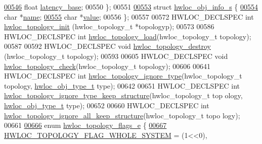 \begin{DoxyCode}
\hypertarget{a00033_source_l00546}{}\hyperlink{a00014_a204416418049a272bfb51602fc676342}{00546}   \textcolor{keywordtype}{float} \hyperlink{a00014_a204416418049a272bfb51602fc676342}{latency_base};           
00550 \};
00551 
\hypertarget{a00033_source_l00553}{}\hyperlink{a00018}{00553} \textcolor{keyword}{struct }\hyperlink{a00018}{hwloc_obj_info_s} \{
\hypertarget{a00033_source_l00554}{}\hyperlink{a00018_a115dde58f40338a2d3276d59c099857d}{00554}   \textcolor{keywordtype}{char} *\hyperlink{a00018_a115dde58f40338a2d3276d59c099857d}{name};   
\hypertarget{a00033_source_l00555}{}\hyperlink{a00018_a522efd7f5262a4493a73fa3476a041ce}{00555}   \textcolor{keywordtype}{char} *\hyperlink{a00018_a522efd7f5262a4493a73fa3476a041ce}{value};  
00556 \};
00557 
00572 HWLOC\_DECLSPEC \textcolor{keywordtype}{int} \hyperlink{a00043_ga5c2d6f476af87005c7bd0811d4548b9f}{hwloc_topology_init} (hwloc\_topology\_t *topologyp);
00573 
00586 HWLOC\_DECLSPEC \textcolor{keywordtype}{int} \hyperlink{a00043_ga91e2e6427b95fb7339c99dbbef996e71}{hwloc_topology_load}(hwloc\_topology\_t topology);
00587 
00592 HWLOC\_DECLSPEC \textcolor{keywordtype}{void} \hyperlink{a00043_ga6040925d3ee4bbb2647f2a321aca5f4b}{hwloc_topology_destroy} (hwloc\_topology\_t topology);
00593 
00605 HWLOC\_DECLSPEC \textcolor{keywordtype}{void} \hyperlink{a00043_gab3628b2a540a5a08e8cf724ef829e70a}{hwloc_topology_check}(hwloc\_topology\_t topology);
00606 
00641 HWLOC\_DECLSPEC \textcolor{keywordtype}{int} \hyperlink{a00044_gaf2071c8621fddc53649c245d87835b47}{hwloc_topology_ignore_type}(hwloc\_topology\_t topology, 
      \hyperlink{a00041_gacd37bb612667dc437d66bfb175a8dc55}{hwloc_obj_type_t} type);
00642 
00651 HWLOC\_DECLSPEC \textcolor{keywordtype}{int} \hyperlink{a00044_ga6ddd4213d95bd1c30555b294a60efa6b}{hwloc_topology_ignore_type_keep_structure}(hwloc\_topology\_t top
      ology, \hyperlink{a00041_gacd37bb612667dc437d66bfb175a8dc55}{hwloc_obj_type_t} type);
00652 
00660 HWLOC\_DECLSPEC \textcolor{keywordtype}{int} \hyperlink{a00044_gaec6fb00050f50cd41007f1ae580d2106}{hwloc_topology_ignore_all_keep_structure}(hwloc\_topology\_t topo
      logy);
00661 
\hypertarget{a00033_source_l00666}{}\hyperlink{a00044_gada025d3ec20b4b420f8038d23d6e7bde}{00666} \textcolor{keyword}{enum} \hyperlink{a00044_gada025d3ec20b4b420f8038d23d6e7bde}{hwloc_topology_flags_e} \{
\hypertarget{a00033_source_l00667}{}\hyperlink{a00044_ggada025d3ec20b4b420f8038d23d6e7bdea129b4fea1300be22bbaf0bb0958994c8}{00667}   \hyperlink{a00044_ggada025d3ec20b4b420f8038d23d6e7bdea129b4fea1300be22bbaf0bb0958994c8}{HWLOC_TOPOLOGY_FLAG_WHOLE_SYSTEM} = (1<<0),

\end{DoxyCode}
